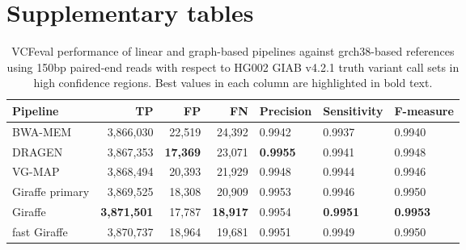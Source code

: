 \documentclass[11pt]{ucscthesis}
\begin{document}
\section{Supplementary tables}

\begin{table}[H]
    \centering
    \begin{tabular}{|l|r|r|r|l|l|l|}
     \hline
    Pipeline                    & TP                 & FP              & FN              & Precision       & Sensitivity     & F-measure       \\
     \hline
    BWA-MEM                     & 3,866,030          & 22,519          & 24,392          & 0.9942          & 0.9937          & 0.9940          \\
    DRAGEN                      & 3,867,353          & \textbf{17,369} & 23,071          & \textbf{0.9955} & 0.9941          & 0.9948
         \\
    VG-MAP                      & 3,868,494          & 20,393          & 21,929          & 0.9948          & 0.9944          & 0.9946          \\
    Giraffe primary             & 3,869,525          & 18,308          & 20,909          & 0.9953          & 0.9946          & 0.9950          \\
    Giraffe                     & \textbf{3,871,501} & 17,787          & \textbf{18,917} & 0.9954          & \textbf{0.9951} & \textbf{0.9953} \\
    fast Giraffe                & 3,870,737          & 18,964          & 19,681          & 0.9951          & 0.9949          & 0.9950          \\
    \hline
    \end{tabular}
\caption[Genotyping evaluation with VCFeval in HG002 using 150bp paired-end reads against the grch38-based graph reference]{VCFeval performance of linear and graph-based pipelines against grch38-based references using 150bp paired-end reads with respect to HG002 GIAB v4.2.1 truth variant call sets in high confidence regions. Best values in each column are highlighted in bold text.}
\label{tab:vcfeval_high_conf_2x150_hg002_grch38}
\end{table}
\end{document}
